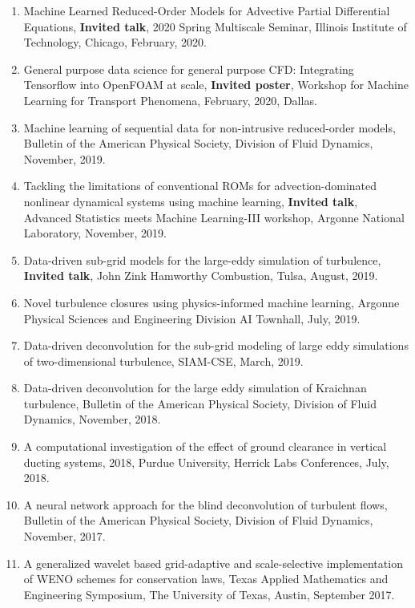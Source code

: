\documentclass[letterpaper]{article}
\begin{document}
\begin{enumerate}
\item Machine Learned Reduced-Order Models for Advective Partial Differential Equations, \textbf{Invited talk}, 2020 Spring Multiscale Seminar, Illinois Institute of Technology, Chicago, February, 2020.

\item General purpose data science for general purpose CFD: Integrating Tensorflow into OpenFOAM at scale, \textbf{Invited poster}, Workshop for Machine Learning for Transport Phenomena, February, 2020, Dallas.

\item Machine learning of sequential data for non-intrusive reduced-order models, Bulletin of the American Physical Society, Division of Fluid Dynamics, November, 2019.

\item Tackling the limitations of conventional ROMs for advection-dominated nonlinear dynamical systems using machine learning, \textbf{Invited talk}, Advanced Statistics meets Machine Learning-III workshop, Argonne National Laboratory, November, 2019.

\item Data-driven sub-grid models for the large-eddy simulation of turbulence, \textbf{Invited talk}, John Zink Hamworthy Combustion, Tulsa, August, 2019.

\item Novel turbulence closures using physics-informed machine learning, Argonne Physical Sciences and Engineering Division AI Townhall, July, 2019. 

\item Data-driven deconvolution for the sub-grid modeling of large eddy simulations of two-dimensional turbulence, SIAM-CSE, March, 2019.

\item Data-driven deconvolution for the large eddy simulation of Kraichnan turbulence, Bulletin of the American Physical Society, Division of Fluid Dynamics, November, 2018.

\item A computational investigation of the effect of ground clearance in vertical ducting systems, 2018, Purdue University, Herrick Labs Conferences, July, 2018. 

\item A neural network approach for the blind deconvolution of turbulent flows, Bulletin of the American Physical Society, Division of Fluid Dynamics, November, 2017.

\item A generalized wavelet based grid-adaptive and scale-selective implementation of WENO schemes for conservation laws, Texas Applied Mathematics and Engineering Symposium, The University of Texas, Austin, September 2017.


\end{enumerate}
\end{document}
